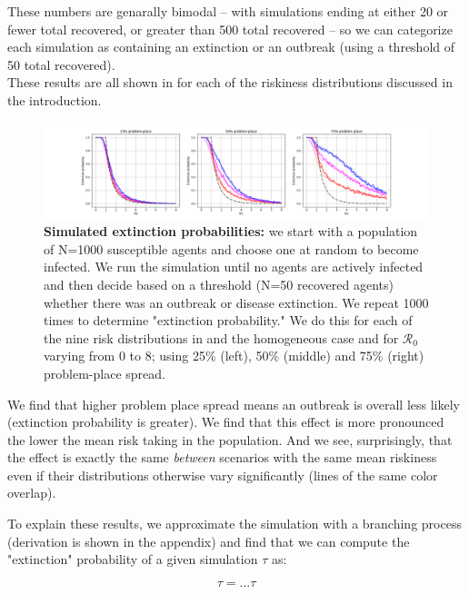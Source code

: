 \documentclass{article}
\begin{document}
These numbers are genarally bimodal – with simulations
ending at either 20 or fewer total recovered, or greater than 500 total
recovered – so we can categorize each simulation as containing an extinction
or an outbreak (using a threshold of 50 total recovered).\\

These results are all shown in  for each of the riskiness
distributions discussed in the introduction.\\


\begin{figure}
\centering
\includegraphics[width=\textwidth]{extinction_results}
\caption{\textbf{Simulated extinction probabilities:} we start with a population
of N=1000 susceptible agents and choose one at random to become infected. We
run the simulation until no agents are actively infected and then
decide based on a threshold (N=50 recovered agents) whether there
was an outbreak or disease extinction. We repeat 1000 times to determine
"extinction probability." We do this for each of the nine risk distributions
in  and the homogeneous case and for
$\mathcal{R}_0$ varying from 0 to 8; using 25\% (left), 50\% (middle) and 
75\% (right) problem-place spread.}
\label{fig:extinction_results}
\end{figure}



We find that higher problem place spread means an outbreak is overall less
likely (extinction probability is greater). We find that this effect is
more pronounced the lower the mean risk taking in the population. And we see,
surprisingly, that the effect is exactly the same \textit{between} scenarios
with the same mean riskiness even if their distributions otherwise vary
significantly (lines of the same color overlap).


To explain these results, we approximate the simulation with a branching process
(derivation is shown in the appendix)
and find that we can compute the "extinction" probability of a given simulation
$\tau$ as:

\begin{equation}
\tau = ... \tau
\label{eqn:extinction}
\end{equation}
\end{document}
